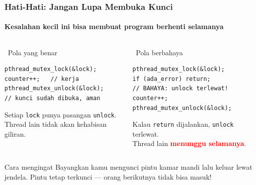 \documentclass[t,aspectratio=169,xcolor=dvipsnames]{beamer}
\newcommand{\tem}[1]{\textbf{\textcolor{red}{#1}}}
\begin{document}
\begin{frame}[fragile]
    \frametitle{Hati-Hati: Jangan Lupa Membuka Kunci}
    \framesubtitle{Kesalahan kecil ini bisa membuat program berhenti selamanya}
    \small

    \begin{columns}[T]
        \begin{exampleblock}{\checkmark\ Pola yang benar}
\begin{lstlisting}[basicstyle=\ttfamily\scriptsize]
pthread_mutex_lock(&lock);
counter++;   // kerja
pthread_mutex_unlock(&lock);
// kunci sudah dibuka, aman
\end{lstlisting}
            Setiap \texttt{lock} punya pasangan \texttt{unlock}.\\
            Thread lain tidak akan kehabisan giliran.
        \end{exampleblock}

        \begin{alertblock}{\texttimes\ Pola berbahaya}
\begin{lstlisting}[basicstyle=\ttfamily\scriptsize]
pthread_mutex_lock(&lock);
if (ada_error) return;
// BAHAYA: unlock terlewat!
counter++;
pthread_mutex_unlock(&lock);
\end{lstlisting}
            Kalau \texttt{return} dijalankan, \texttt{unlock} terlewat.\\
            Thread lain \tem{menunggu selamanya}.
        \end{alertblock}
    \end{columns}

    \begin{block}{Cara mengingat}
        Bayangkan kamu mengunci pintu kamar mandi lalu keluar lewat jendela.
        Pintu tetap terkunci — orang berikutnya tidak bisa masuk!
    \end{block}
\end{frame}
\end{document}
